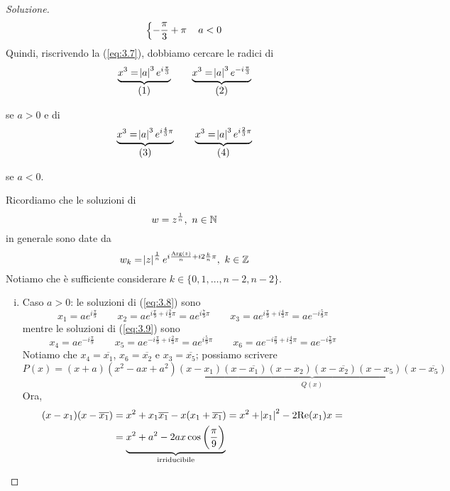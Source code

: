 \begin{proof}[Soluzione]
\[\begin{dcases}
         -\frac{\pi}{3}+\pi\, & a<0
    \end{dcases}
    \]
    Quindi, riscrivendo la (\ref{eq:3.7}), dobbiamo cercare le radici di
    \[
    \underbrace{x^3 = \abs{a}^3 e^{i\frac{\pi}{3}}}_{\stepcounter{equation}\mbox{(\theequation)}} \nonumber \qquad \underbrace{x^3 = \abs{a}^3 e^{-i\frac{\pi}{3}}}_{\stepcounter{equation}\mbox{(\theequation)}} \nonumber
    \]
    \addtocounter{equation}{-2}\label{eq:3.8}
    \addtocounter{equation}{0}\label{eq:3.9}
    se $a>0$ e di 
    \[
    \underbrace{x^3 = \abs{a}^3 e^{i\frac{4}{3}\pi}}_{\stepcounter{equation}\mbox{(\theequation)}} \nonumber \qquad \underbrace{x^3 = \abs{a}^3 e^{i\frac{2}{3}\pi}}_{\stepcounter{equation}\mbox{(\theequation)}} \nonumber
    \]
    \addtocounter{equation}{-2}\label{eq:3.10}
    \addtocounter{equation}{0}\label{eq:3.11}
    se $a<0$.
    \begin{tcolorbox}
        Ricordiamo che le soluzioni di
        \[
        w = z^{\frac{1}{n}}, \ n\in\amsbb{N}
        \]
        in generale sono date da
        \[
        w_k = \abs{z}^{\frac{1}{n}} e^{i\frac{\mathrm{Arg}(z)}{n}+i2\frac{k}{n}\pi}, \ k\in\amsbb{Z} 
        \]
        Notiamo che è sufficiente considerare $k\in\{0, 1, \dots, n-2, n-2\}$.
    \end{tcolorbox}
    \begin{enumerate}[(i)]
        \item Caso $a>0$: le soluzioni di (\ref{eq:3.8}) sono
    \[
    x_1 = {a} e^{i\frac{\pi}{9}} \qquad x_2 ={a}e^{i\frac{\pi}{9}+i\frac{2}{3}\pi} = {a} e^{i\frac{7}{9}\pi} \qquad x_3 = {a}e^{i\frac{\pi}{9}+i\frac{4}{3}\pi} = {a} e^{-i\frac{5}{9}\pi}
    \]
    mentre le soluzioni di (\ref{eq:3.9}) sono
    \[
    x_4 = {a} e^{-i\frac{\pi}{9}} \qquad x_5 ={a}e^{-i\frac{\pi}{9}+i\frac{2}{3}\pi} = {a}e^{i\frac{5}{9}\pi} \qquad x_6 = {a}e^{-i\frac{\pi}{9}+i\frac{4}{3}\pi} = {a} e^{-i\frac{7}{9}\pi}
    \]
    Notiamo che $x_4 = \overline{x_1}$, $x_6 = \overline{x_2}$ e $x_3 = \overline{x_5}$; possiamo scrivere
    \[
    P(x) = (x+a)(x^2-ax+a^2)\underbrace{(x-x_1)(x-\overline{x_1})(x-x_2)(x-\overline{x_2})(x-x_5)(x-\overline{x_5})}_{Q(x)}
    \]
    Ora,
    \[
    \begin{split}
        (x-x_1)(x-\overline{x_1}) &= x^2 + x_1 \overline{x_1}-x(x_1 + \overline{x_1}) = x^2 + \abs{x_1}^2 -2\mathrm{Re}(x_1)x = \\
        & = \underbrace{ x^2 + a^2 -2{a}x\cos\left(\frac{\pi}{9}\right)}_{\text{irriducibile}}

\end{split}\]
\end{enumerate}
\end{proof}
